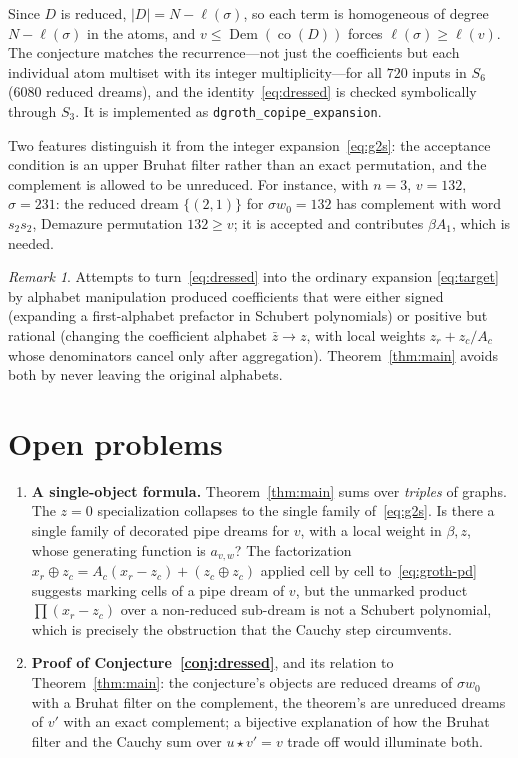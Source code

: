 \documentclass[11pt]{article}
\theoremstyle{definition}
\theoremstyle{remark}
\newtheorem{remark}[theorem]{Remark}
\newcommand{\Dem}{\operatorname{Dem}}
\newcommand{\co}{\operatorname{co}}
\newcommand{\dem}{\star}
\begin{document}
Since $D$ is reduced, $|D|=N-\ell(\sigma)$, so each term is homogeneous of
degree $N-\ell(\sigma)$ in the atoms, and $v\le\Dem(\co(D))$ forces
$\ell(\sigma)\ge\ell(v)$.  The conjecture matches the recurrence---not just
the coefficients but each individual atom multiset with its integer
multiplicity---for all $720$ inputs in $S_6$ (6080 reduced dreams), and the
identity~\eqref{eq:dressed} is checked symbolically through $S_3$.  It is
implemented as \texttt{dgroth\_copipe\_expansion}.

Two features distinguish it from the integer expansion~\eqref{eq:g2s}:
the acceptance condition is an upper Bruhat filter rather than an exact
permutation, and the complement is allowed to be unreduced.  For instance,
with $n=3$, $v=132$, $\sigma=231$: the reduced dream $\{(2,1)\}$ for
$\sigma w_0=132$ has complement with word $s_2s_2$, Demazure permutation
$132\ge v$; it is accepted and contributes $\beta A_1$, which is needed.

\begin{remark}
Attempts to turn~\eqref{eq:dressed} into the ordinary expansion
\eqref{eq:target} by alphabet manipulation produced coefficients that were
either signed (expanding a first-alphabet prefactor in Schubert polynomials)
or positive but rational (changing the coefficient alphabet $\bar z\to z$,
with local weights $z_r+z_c/A_c$ whose denominators cancel only after
aggregation).  Theorem~\ref{thm:main} avoids both by never leaving the
original alphabets.
\end{remark}

\section{Open problems}

\begin{enumerate}
\item \textbf{A single-object formula.}  Theorem~\ref{thm:main} sums over
 \emph{triples} of graphs.  The $z=0$ specialization collapses to the single
 family of~\eqref{eq:g2s}.  Is there a single family of decorated pipe dreams
 for $v$, with a local weight in $\beta,z$, whose generating function is
 $a_{v,w}$?  The factorization $x_r\oplus z_c=A_c(x_r-z_c)+(z_c\oplus z_c)$
 applied cell by cell to~\eqref{eq:groth-pd} suggests marking cells of a
 pipe dream of $v$, but the unmarked product $\prod(x_r-z_c)$ over a
 non-reduced sub-dream is not a Schubert polynomial, which is precisely the
 obstruction that the Cauchy step circumvents.
\item \textbf{Proof of Conjecture~\ref{conj:dressed}}, and its relation to
 Theorem~\ref{thm:main}: the conjecture's objects are reduced dreams of
 $\sigma w_0$ with a Bruhat filter on the complement, the theorem's are
 unreduced dreams of $v'$ with an exact complement; a bijective explanation
 of how the Bruhat filter and the Cauchy sum over $u\dem v'=v$ trade off
 would illuminate both.
\end{enumerate}
\end{document}
